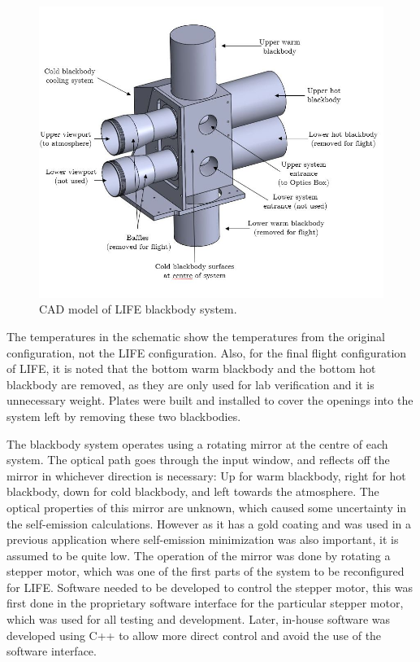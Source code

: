 \begin{figure}
    \centering
    \includegraphics[width=\linewidth]{chap3_images/Blackbody_CAD_labelled.JPG}
    \caption{CAD model of LIFE blackbody system.}
    \label{fig:CAD_Blackbodies}
\end{figure}

The temperatures in the schematic show the temperatures from the original configuration, not the LIFE configuration. Also, for the final flight configuration of LIFE, it is noted that the bottom warm blackbody and the bottom hot blackbody are removed, as they are only used for lab verification and it is unnecessary weight. Plates were built and installed to cover the openings into the system left by removing these two blackbodies.

The blackbody system operates using a rotating mirror at the centre of each system. The optical path goes through the input window, and reflects off the mirror in whichever direction is necessary: Up for warm blackbody, right for hot blackbody, down for cold blackbody, and left towards the atmosphere. The optical properties of this mirror are unknown, which caused some uncertainty in the self-emission calculations. However as it has a gold coating and was used in a previous application where self-emission minimization was also important, it is assumed to be quite low. The operation of the mirror was done by rotating a stepper motor, which was one of the first parts of the system to be reconfigured for LIFE. Software needed to be developed to control the stepper motor, this was first done in the proprietary software interface for the particular stepper motor, which was used for all testing and development. Later, in-house software was developed using C++ to allow more direct control and avoid the use of the software interface. 

